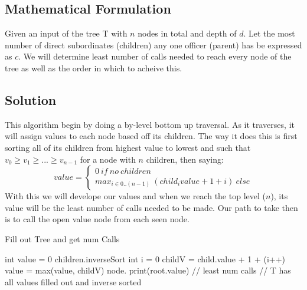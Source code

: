 \documentclass[12pt]{article}
\begin{document}

\newpage

\subsection{Mathematical Formulation}
Given an input of the tree T with $n$ nodes in total and depth of $d$. Let the most
number of direct subordinates (children) any one officer (parent) has be expressed as
$c$. We will determine least number of calls needed to reach every node of the tree as
well as the order in which to acheive this.


\subsection{Solution}
This algorithm begin by doing a by-level bottom up traversal. As it traverses, it will
assign values to each node based off its children. The way it does this is first sorting
all of its children from highest value to lowest and such that $v_0 \geq v_1 \geq ... \geq v_{n-1}$ for
a node with $n$ children, then saying:
\[ value =
\begin{cases}
    0\ if\ no\ children \\
    max_{i \in 0..(n-1)}\ (child_{i}value + 1 + i)\ else
\end{cases}
\]
With this we will develope our values and when we reach the top level ($n$), its value
will be the least number of calls needed to be made. Our path to take then is to call
the open value node from each seen node.

\begin{algorithm}[H]
\caption{Fill out Tree and get num Calls}
\begin{algorithmic}
                \State int value = 0
                    \State children.inverseSort
                    \State int i = 0
                        \State childV = child.value + 1 + (i++)
                        \State value = max(value, childV)
                    \EndFor
                \EndIf
                \State node.
            \EndFor
        \EndFor
        \State print(root.value)  // least num calls
        \State {} // T has all values filled out and inverse sorted
    \EndProcedure
\end{algorithmic}
\end{algorithm}
\end{document}
